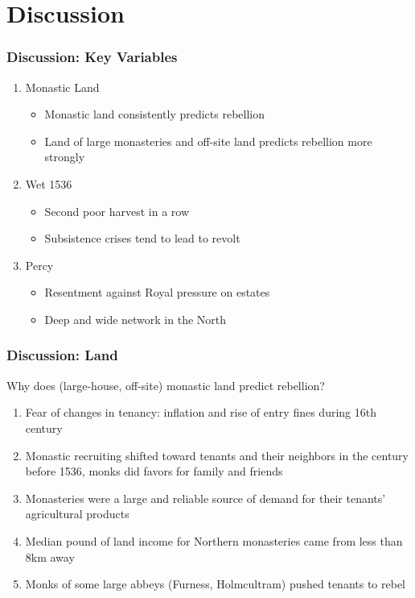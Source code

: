 \documentclass{beamer}
\begin{document}
    \section{Discussion}
    \begin{frame}
        \frametitle{Discussion: Key Variables}
        \begin{enumerate}
            \item Monastic Land
            \begin{itemize}
                \item Monastic land consistently predicts rebellion
                \item Land of large monasteries and off-site land predicts rebellion more strongly
            \end{itemize}
            \item Wet 1536
            \begin{itemize}
                \item Second poor harvest in a row
                \item Subsistence crises tend to lead to revolt
            \end{itemize}
            \item Percy
            \begin{itemize}
                \item Resentment against Royal pressure on estates
                \item Deep and wide network in the North
            \end{itemize}
        \end{enumerate}
    \end{frame}
    \begin{frame}
        \frametitle{Discussion: Land}
        Why does (large-house, off-site) monastic land predict rebellion?
        \begin{enumerate}
            \item Fear of changes in tenancy: inflation and rise of entry fines during 16th century
            \item Monastic recruiting shifted toward tenants and their neighbors in the century before 1536, monks did favors for family and friends
            \item Monasteries were a large and reliable source of demand for their tenants' agricultural products
            \item Median pound of land income for Northern monasteries came from less than 8km away
            \item Monks of some large abbeys (Furness, Holmcultram) pushed tenants to rebel
        \end{enumerate}
    \end{frame}
\end{document}

